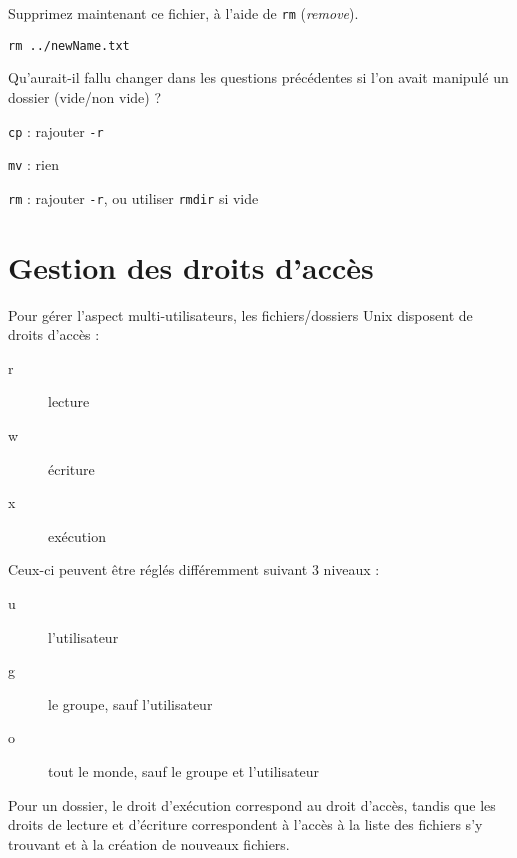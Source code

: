 \documentclass{scrartcl}
\begin{document}
\begin{question}[name=Q.]
	Supprimez maintenant ce fichier, à l'aide de \lstinline|rm| (\emph{remove}).
\end{question}
\begin{solution}
	\lstinline|rm ../newName.txt|
\end{solution}

\begin{question}[name=Q.]
	Qu'aurait-il fallu changer dans les questions précédentes si l'on avait manipulé un dossier (vide/non vide) ?
\end{question}
\begin{solution}
	\begin{description}
		\item \lstinline|cp| : rajouter \lstinline|-r|
		\item \lstinline|mv| : rien
		\item \lstinline|rm| : rajouter \lstinline|-r|, ou utiliser \lstinline|rmdir| si vide
	\end{description}
\end{solution}

\section{Gestion des droits d'accès}

Pour gérer l'aspect multi-utilisateurs, les fichiers/dossiers Unix disposent de droits d'accès :

\begin{description}
	\item[r] lecture
	\item[w] écriture
	\item[x] exécution
\end{description}

Ceux-ci peuvent être réglés différemment suivant 3 niveaux :

\begin{description}
	\item[u] l'utilisateur
	\item[g] le groupe, sauf l'utilisateur
	\item[o] tout le monde, sauf le groupe et l'utilisateur
\end{description}

Pour un dossier, le droit d’exécution correspond au droit d'accès, tandis que les droits de lecture et d'écriture correspondent à l'accès à la liste des fichiers s'y trouvant et à la création de nouveaux fichiers.
\end{document}
